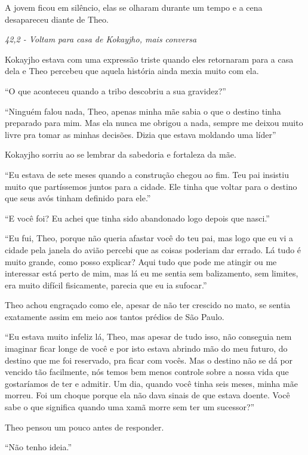 A jovem ficou em silêncio, elas se olharam durante um tempo e a cena
desapareceu diante de Theo.

\asterisc

\emph{42,2 - Voltam para casa de Kokayjho, mais conversa}

Kokayjho estava com uma expressão triste quando eles retornaram para a
casa dela e Theo percebeu que aquela história ainda mexia muito com ela.

``O que aconteceu quando a tribo descobriu a sua gravidez?''

``Ninguém falou nada, Theo, apenas minha mãe sabia o que o destino tinha
preparado para mim. Mas ela nunca me obrigou a nada, sempre me deixou
muito livre pra tomar as minhas decisões. Dizia que estava moldando uma
líder''

Kokayjho sorriu ao se lembrar da sabedoria e fortaleza da mãe.

``Eu estava de sete meses quando a construção chegou ao fim. Teu pai
insistiu muito que partíssemos juntos para a cidade. Ele tinha que
voltar para o destino que seus avós tinham definido para ele.''

``E você foi? Eu achei que tinha sido abandonado logo depois que
nasci.''

``Eu fui, Theo, porque não queria afastar você do teu pai, mas logo que
eu vi a cidade pela janela do avião percebi que as coisas poderiam dar
errado. Lá tudo é muito grande, como posso explicar? Aqui tudo que pode
me atingir ou me interessar está perto de mim, mas lá eu me sentia sem
balizamento, sem limites, era muito difícil fisicamente, parecia que eu
ia sufocar.''

Theo achou engraçado como ele, apesar de não ter crescido no mato, se
sentia exatamente assim em meio aos tantos prédios de São Paulo.

``Eu estava muito infeliz lá, Theo, mas apesar de tudo isso, não
conseguia nem imaginar ficar longe de você e por isto estava abrindo mão
do meu futuro, do destino que me foi reservado, pra ficar com vocês. Mas
o destino não se dá por vencido tão facilmente, nós temos bem menos
controle sobre a nossa vida que gostaríamos de ter e admitir. Um dia,
quando você tinha seis meses, minha mãe morreu. Foi um choque porque ela
não dava sinais de que estava doente. Você sabe o que significa quando
uma xamã morre sem ter um sucessor?''

Theo pensou um pouco antes de responder.

``Não tenho ideia.''

